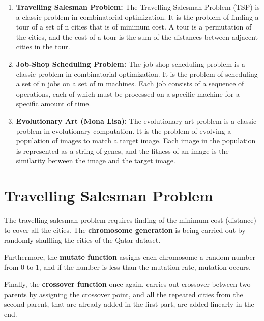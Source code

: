 \documentclass[12pt]{article}
\begin{document}
\begin{enumerate}
    \item \textbf{Travelling Salesman Problem:} The Travelling Salesman Problem (TSP) is a classic problem in combinatorial optimization. It is the problem of finding a tour of a set of n cities that is of minimum cost. A tour is a permutation of the cities, and the cost of a tour is the sum of the distances between adjacent cities in the tour.
    \item \textbf{Job-Shop Scheduling Problem:} The job-shop scheduling problem is a classic problem in combinatorial optimization. It is the problem of scheduling a set of n jobs on a set of m machines. Each job consists of a sequence of operations, each of which must be processed on a specific machine for a specific amount of time.
    \item \textbf{Evolutionary Art (Mona Lisa):} The evolutionary art problem is a classic problem in evolutionary computation. It is the problem of evolving a population of images to match a target image. Each image in the population is represented as a string of genes, and the fitness of an image is the similarity between the image and the target image.
\end{enumerate}

\section{Travelling Salesman Problem}

The travelling salesman problem requires finding of the minimum cost (distance) to cover all the cities. The \textbf{chromosome generation} is being carried out by randomly shuffling the cities of the Qatar dataset. 

Furthermore, the \textbf{mutate function} assigns each chromosome a random number from 0 to 1, and if the number is less than the mutation rate, mutation occurs. 

Finally, the \textbf{crossover function} once again, carries out crossover between two parents by assigning the crossover point, and all the repeated cities from the second parent, that are already added in the first part, are added linearly in the end. 
\end{document}
